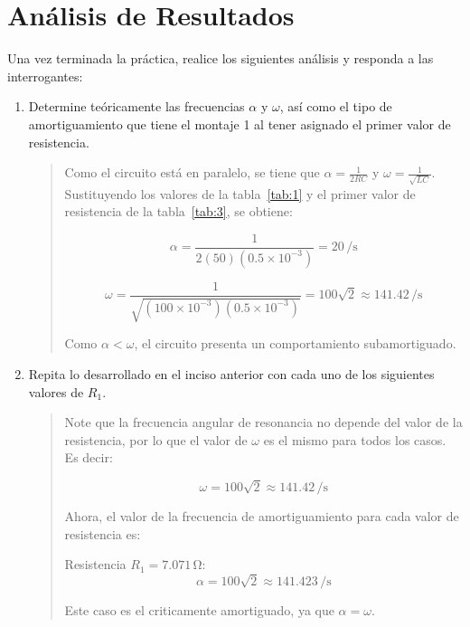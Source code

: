 \documentclass{article}
\begin{document}
    \section{Análisis de Resultados}

    Una vez terminada la práctica, realice los siguientes análisis y responda a las interrogantes:

    \begin{enumerate}[label=\alph*.-] %
        \item Determine teóricamente las frecuencias $\alpha$ y $\omega$, así como el tipo de amortiguamiento que tiene el montaje 1 al tener asignado el primer valor de resistencia.
        
        \begin{quote}
            Como el circuito está en paralelo, se tiene que $\alpha = \frac{1}{2RC}$ y $\omega = \frac{1}{\sqrt{LC}}$. Sustituyendo los valores de la tabla~\ref{tab:1} y el primer valor de resistencia de la tabla~\ref{tab:3}, se obtiene:

            \[
                \alpha = \frac{1}{2(50)(0.5\times10^{-3})} = 20\,\si{\per\second}
            \]

            \[
                \omega = \frac{1}{\sqrt{(100\times10^{-3})(0.5\times10^{-3})}} = 100\sqrt{2}\approx 141.42\,\si{\per\second}
            \]

            Como $\alpha < \omega$, el circuito presenta un comportamiento subamortiguado.
        \end{quote}

        \item Repita lo desarrollado en el inciso anterior con cada uno de los siguientes valores de $R_1$.
        
        \begin{quote}
            Note que la frecuencia angular de resonancia no depende del valor de la resistencia, por lo que el valor de $\omega$ es el mismo para todos los casos. Es decir:

            \[
                \omega = 100\sqrt{2}\approx 141.42\,\si{\per\second}
            \]

            Ahora, el valor de la frecuencia de amortiguamiento para cada valor de resistencia es:

            Resistencia $R_1 = 7.071\,\unit{\ohm}$:
            \[
                \alpha = 100\sqrt{2}\approx 141.423\,\si{\per\second}
            \]

            Este caso es el criticamente amortiguado, ya que $\alpha = \omega$.


\end{quote}
\end{enumerate}
\end{document}
